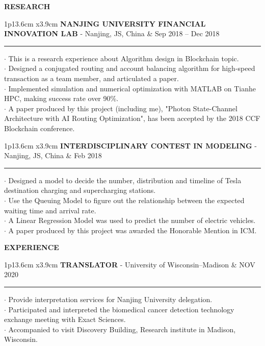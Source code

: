 \documentclass[11pt,A4]{article}
\newcommand{\cvsection}[1]
{
	\begin{center}
		\large\textcolor{sectcol}{\textbf{#1}}
	\end{center}
}
\newcommand{\cvevent}[3]
{

\begin{tabular*}{1\textwidth}{p{13.6cm}  x{3.9cm}}
	\textbf{#2} - \textcolor{bgcol}{#3} &   \vspace{2.5pt}\textcolor{sectcol}{#1}
\end{tabular*}

\vspace{-8pt}
\textcolor{softcol}{\hrule}
\vspace{6pt}


}
\begin{document}
\cvsection{RESEARCH}

\cvevent{Sep 2018 – Dec 2018}
        {NANJING UNIVERSITY FINANCIAL INNOVATION LAB}
        {Nanjing, JS, China}

        $\cdot$ This is a research experience about Algorithm design in Blockchain topic.\\
        $\cdot$ Designed a conjugated routing and account balancing algorithm for
                high-speed transaction as a team member, and articulated a paper.\\
        $\cdot$ Implemented simulation and numerical optimization with MATLAB on Tianhe HPC, 
                making success rate over 90\%.\\
        $\cdot$ A paper produced by this project (including me), 
                "Photon State-Channel Architecture with AI Routing Optimization", 
                has been accepted by the 2018 CCF Blockchain conference.\\

\cvevent{Feb 2018}
        {INTERDISCIPLINARY CONTEST IN MODELING}
        {Nanjing, JS, China}

        $\cdot$ Designed a model to decide the number,
                distribution and timeline of Tesla destination charging 
                and supercharging stations.\\
        $\cdot$ Use the Queuing Model to figure out the relationship between 
                the expected waiting time and arrival rate.\\
        $\cdot$ A Linear Regression Model was used to predict the number of electric vehicles.\\
        $\cdot$ A paper produced by this project was awarded the Honorable Mention in ICM.\\



\cvsection{EXPERIENCE}
\cvevent{NOV 2020}
        {TRANSLATOR}
        {University of Wisconsin–Madison}

        $\cdot$ Provide interpretation services for Nanjing University delegation.\\
        $\cdot$ Participated and interpreted the biomedical cancer detection 
                technology exchange meeting with Exact Sciences.\\
        $\cdot$ Accompanied to visit Discovery Building, Research institute in Madison, Wisconsin.\\
\end{document}
